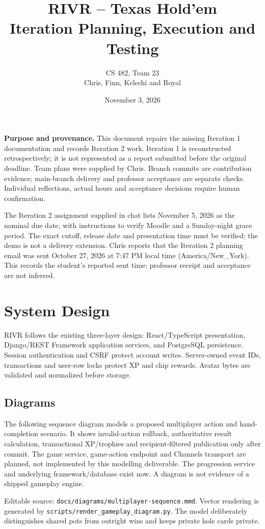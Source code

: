 \documentclass[11pt,a4paper]{article}
\title{RIVR -- Texas Hold'em\\Iteration Planning, Execution and Testing}
\author{CS 482, Team 23\\Chris, Finn, Kelechi and Royal}
\date{November 3, 2026}
\begin{document}
\maketitle
\textbf{Purpose and provenance.} This document repairs the missing Iteration 1 documentation and records Iteration 2 work. Iteration 1 is reconstructed retrospectively; it is not represented as a report submitted before the original deadline. Team plans were supplied by Chris. Branch commits are contribution evidence; main-branch delivery and professor acceptance are separate checks. Individual reflections, actual hours and acceptance decisions require human confirmation.

The Iteration 2 assignment supplied in chat lists November 5, 2026 as the nominal due date, with instructions to verify Moodle and a Sunday-night grace period. The exact cutoff, release date and presentation time must be verified; the demo is not a delivery extension. Chris reports that the Iteration 2 planning email was sent October 27, 2026 at 7:47 PM local time (America/New\_York). This records the student's reported sent time; professor receipt and acceptance are not inferred.

\setcounter{tocdepth}{1}
{\small\tableofcontents}
\newpage
\section{System Design}
RIVR follows the existing three-layer design: React/TypeScript presentation, Django/REST Framework application services, and PostgreSQL persistence. Session authentication and CSRF protect account writes. Server-owned event IDs, transactions and user-row locks protect XP and chip rewards. Avatar bytes are validated and normalized before storage.

\subsection{Diagrams}
The following sequence diagram models a proposed multiplayer action and hand-completion scenario. It shows invalid-action rollback, authoritative result calculation, transactional XP/trophies and recipient-filtered publication only after commit. The game service, game-action endpoint and Channels transport are planned, not implemented by this modelling deliverable. The progression service and underlying framework/database exist now. A diagram is not evidence of a shipped gameplay engine.

Editable source: \texttt{docs/diagrams/multiplayer-sequence.mmd}. Vector rendering is generated by \texttt{scripts/render\_gameplay\_diagram.py}. The model deliberately distinguishes shared pots from outright wins and keeps private hole cards private.

\end{document}
